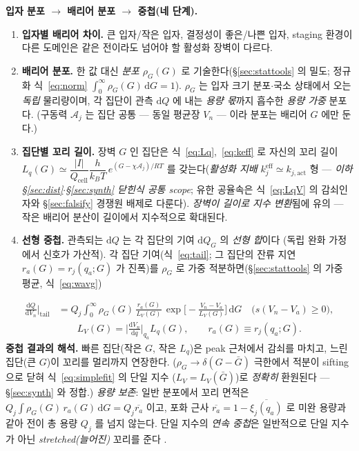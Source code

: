 \documentclass[11pt,a4paper]{article}
\newcommand{\dd}{\mathrm{d}}
\newcommand{\eff}{\mathrm{eff}}
\newcommand{\cell}{\mathrm{cell}}
\begin{document}
\textbf{입자 분포 $\to$ 배리어 분포 $\to$ 중첩(네 단계).}
\begin{enumerate}[label=\textbf{(\alph*)},leftmargin=2.2em,itemsep=2pt]
\item \textbf{입자별 배리어 차이.} 큰 입자/작은 입자, 결정성이 좋은/나쁜 입자, staging 환경이 다른 도메인은
  같은 전이라도 넘어야 할 활성화 장벽이 다르다.
\item \textbf{배리어 분포.} 한 값 대신 \emph{분포} $\rho_G(G)$ 로 기술한다(\S\ref{sec:stattools} 의 밀도;
  정규화 식~\eqref{eq:norm} $\int_0^\infty\rho_G(G)\,\dd G=1$). $\rho_G$ 는 입자 크기 분포$\cdot$국소 상태에서
  오는 \emph{독립} 물리량이며, 각 집단이 관측 $\dd Q$ 에 내는 \emph{용량 몫}까지 흡수한 \emph{용량 가중} 분포다. (구동력 $\mathcal A_j$ 는 집단 공통 —
  동일 평균장 $V_n$ — 이라 분포는 배리어 $G$ 에만 둔다.)
\item \textbf{집단별 꼬리 길이.} 장벽 $G$ 인 집단은 식~\eqref{eq:Lq},~\eqref{eq:keff} 로 자신의 꼬리
  길이 $L_{q}(G)\simeq\dfrac{|I|}{Q_\cell}\dfrac{h}{k_BT}\,e^{(G-\chi\mathcal A_j)/RT}$ 를 갖는다(\emph{활성화 지배}
  $k_j^{\eff}\simeq k_{j,\mathrm{act}}$ 형 — \emph{이하 \S\ref{sec:dist}$\cdot$\S\ref{sec:synth} 닫힌식 공통 scope};
  유한 공율속은 식~\eqref{eq:LqV} 의 감쇠인자와 \S\ref{sec:falsify} 경쟁원 배제로 다룬다). \emph{장벽이 길이로
  지수 변환}됨에 유의 — 작은 배리어 분산이 길이에서 지수적으로 확대된다.
\item \textbf{선형 중첩.} 관측되는 $\dd Q$ 는 각 집단의 기여 $\dd Q_G$ 의 \emph{선형 합}이다
  (독립 완화 가정에서 신호가 가산적). 각 집단 기여(식~\eqref{eq:tail}; 그 집단의 잔류 지연 $r_a(G)=r_j(q_a;G)$ 가
  진폭)를 $\rho_G$ 로 가중 적분하면(\S\ref{sec:stattools} 의 가중 평균, 식~\eqref{eq:wavg})
\end{enumerate}
\begin{equation}
\boxed{\;\begin{aligned}
\frac{\dd Q}{\dd V_n}\Big|_{\text{tail}}&=Q_j\!\int_0^\infty\!\rho_G(G)\,\frac{r_a(G)}{L_V(G)}\,
\exp\!\Big[-\frac{V_n-V_a}{L_V(G)}\Big]\,\dd G\quad\big(s(V_n-V_a)\ge0\big),\\[2pt]
&\qquad L_V(G)=\Big|\frac{\dd V_n}{\dd q}\Big|_{q_a}\!\!L_q(G),\qquad r_a(G)\equiv r_j(q_a;G).
\end{aligned}\;}
\label{eq:superpose}
\end{equation}
\textbf{중첩 결과의 해석.} 빠른 집단(작은 $G$, 작은 $L_q$)은 peak 근처에서 감쇠를 마치고, 느린 집단(큰 $G$)이 꼬리를 멀리까지
연장한다. ($\rho_G\to\delta(G-\bar G)$ 극한에서 적분이 sifting 으로 닫혀 식~\eqref{eq:simplefit} 의 단일 지수
($L_V=L_V(\bar G)$)로 \emph{정확히} 환원된다 — \S\ref{sec:synth} 와 정합.) \emph{용량 보존}: 일반 분포에서 꼬리 면적은
$Q_j\!\int\!\rho_G(G)\,r_a(G)\,\dd G=Q_j\overline{r_a}$ 이고, 포화 근사 $\overline{r_a}=1-\overline{\xi_j(q_a)}$ 로 미완 용량과
같아 전이 총 용량 $Q_j$ 를 넘지 않는다. 단일 지수의 \emph{연속 중첩}은 일반적으로
단일 지수가 아닌 \emph{stretched(늘어진)} 꼬리를 준다 \cite{lindsey1980,johnston2006,svare2000}.
\end{document}
